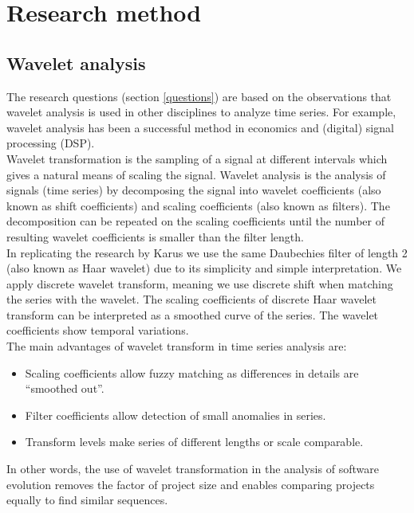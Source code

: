 \chapter{Research method}
\label{method}

\section{Wavelet analysis}
The research questions (section \ref{questions}) are based on the observations
that wavelet analysis is used in other disciplines to analyze time series. For
example, wavelet analysis has been a successful method in economics and
(digital) signal processing (DSP).\\

Wavelet transformation is the sampling of a signal at different intervals which
gives a natural means of scaling the signal. Wavelet analysis is the analysis of
signals (time series) by decomposing the signal into wavelet coefficients (also
known as shift coefficients) and scaling coefficients (also known as filters).
The decomposition can be repeated on the scaling coefficients until the number
of resulting wavelet coefficients is smaller than the filter length.\\

In replicating the research by Karus we use the same Daubechies filter of
length 2 (also known as Haar wavelet) due to its simplicity and simple interpretation.
We apply discrete wavelet transform, meaning we use discrete shift when matching
the series with the wavelet. The scaling coefficients of discrete Haar wavelet
transform can be interpreted as a smoothed curve of the series. The wavelet
coefficients show temporal variations.\\

\noindent
The main advantages of wavelet transform in time series analysis are:
\begin{itemize}
	\item Scaling coefficients allow fuzzy matching as differences in details are
	``smoothed out''.
	\item Filter coefficients allow detection of small anomalies in series.
	\item Transform levels make series of different lengths or scale comparable.
\end{itemize}

In other words, the use of wavelet transformation in the analysis of software
evolution removes the factor of project size and enables comparing projects
equally to find similar sequences.

